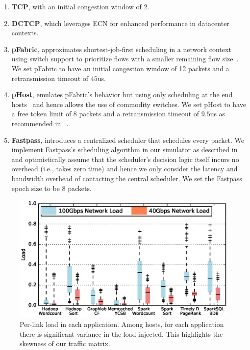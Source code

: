 \begin{enumerate}[leftmargin=*]
\itemsep0em
\item {\bf TCP}, with an initial congestion window of 2.
\item {\bf DCTCP}, which leverages ECN for enhanced performance in datacenter contexts.  
\item {\bf pFabric}, approximates shortest-job-first scheduling in a network context using switch support to prioritize  flows with a smaller remaining flow size~\cite{pfabric}. We set pFabric to have an initial congestion window of 12 packets and a retransmission timeout of $45$us.
%
\item {\bf pHost}, emulates pFabric's behavior but using only scheduling at the end hosts~\cite{phost} and hence allows the use of commodity switches. We set pHost to have a free token limit of 8 packets and a retransmission timeout of $9.5$us as recommended in ~\cite{phost}.
%
\item {\bf Fastpass}, introduces a centralized scheduler that schedules every packet. We implement Fastpass's scheduling algorithm in our simulator as described in ~\cite{phost} and optimistically assume that the scheduler's decision logic itself incurs no overhead (i.e., takes zero time) and hence we only consider the latency and bandwidth overhead of contacting the central scheduler. 
We set the Fastpass epoch size to be 8 packets.%
%
\end{enumerate}

\begin{figure}
  \centering
  \includegraphics[width = \columnwidth]{img/load} 
  \caption{\small{Per-link load in each application. Among hosts, for each application there is significant variance in the load injected. This highlights the skewness of our traffic matrix.}}
  \label{fig:loadcdf}
\end{figure}



